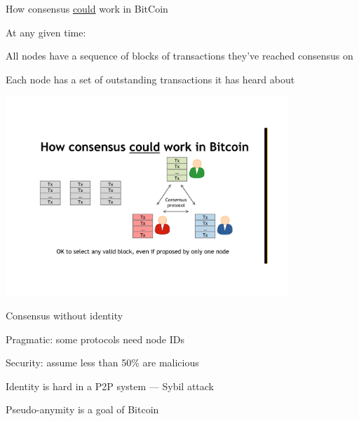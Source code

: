 \begin{frame}{How consensus \underline{could} work in BitCoin}
	
At any given time:
\BIL
\item All nodes have a sequence of blocks of transactions they've reached consensus on
\item Each node has a set of outstanding transactions it has heard about 
\EIL

\begin{center}
\includegraphics[width=0.8\textwidth]{consensus-could}
\end{center}

\end{frame}


\begin{frame}{Consensus without identity}
\BI
\item Pragmatic: some protocols need node IDs
\item Security: assume less than 50\% are malicious
\EI

\BI
\item Identity is hard in a P2P system — Sybil attack
\item Pseudo-anymity is a goal of Bitcoin
\EI



\end{frame}

